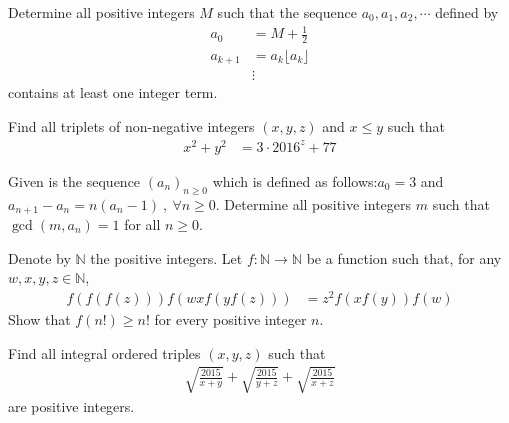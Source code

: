\begin{problem}
	Determine all positive integers $M$ such that the sequence $a_0, a_1, a_2, \cdots$ defined by
		\begin{align*}
			a_0
				& = M + \frac{1}{2}\\
			a_{k+1}
				& = a_k\lfloor a_k \rfloor\\
				& \vdots
		\end{align*}
	contains at least one integer term. %
\end{problem}

\begin{problem}[Greece 2016]
	Find all triplets of non-negative integers $(x,y,z)$ and $x\leq y$ such that
		\begin{align*}
			x^2+y^2
				& =3 \cdot 2016^z+77
		\end{align*}
\end{problem}

\begin{problem}
	Given is the sequence $(a_n)_{n\geq 0}$ which is defined as follows:$a_0=3$ and $a_{n+1}-a_n=n(a_n-1) \ , \ \forall n\geq 0$. Determine all positive integers $m$ such that $\gcd (m,a_n)=1$ for all $n\geq 0$. %
\end{problem}

\begin{problem}
	Denote by $\mathbb{N}$ the positive integers. Let $f:\mathbb{N} \rightarrow \mathbb{N}$ be a function such that, for any $w,x,y,z \in \mathbb{N}$,
		\begin{align*}
			f(f(f(z)))f(wxf(yf(z)))
				& =z^{2}f(xf(y))f(w)
		\end{align*}
	Show that $f(n!) \ge n!$ for every positive integer $n$. %
\end{problem}

\begin{problem}
	Find all integral ordered triples $(x,y,z)$ such that
		\begin{align*}
			\sqrt{\frac{2015}{x+y}}+\sqrt{\frac{2015}{y+z}}+\sqrt{\frac{2015}{x+z}}
		\end{align*}
	are positive integers. %
\end{problem}

